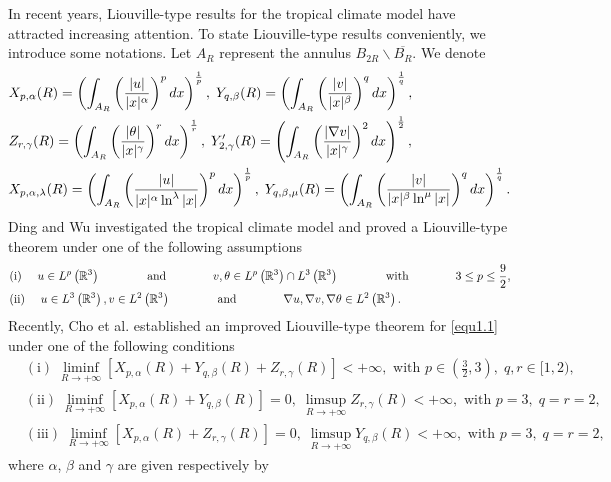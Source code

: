 \documentclass[11pt,reqno]{amsart}
\numberwithin{Thm}{section}
\begin{document}
In recent years, Liouville-type results for the tropical climate model have attracted increasing attention.
To state Liouville-type results conveniently, we introduce some notations.
Let $A_R$ represent the annulus $B_{2R}\backslash \overline{B_R}$. We denote
\begin{align}
&X_{p,\alpha}(R)=\left(\int_{A_R}\left(\frac{|u|}{|x|^\alpha}\right)^pdx\right)^\frac{1}{p},\;Y_{q,\beta}(R)=\left(\int_{A_R}\left(\frac{|v|}{|x|^\beta}\right)^qdx\right)^\frac{1}{q},\notag \\
&Z_{r,\gamma}(R)=\left(\int_{A_R}\left(\frac{|\theta|}{|x|^\gamma}\right)^rdx\right)^\frac{1}{r},\;Y'_{2,\gamma}(R)=\left(\int_{A_R}\left(\frac{|\nabla v|}{|x|^\gamma}\right)^2dx\right)^\frac{1}{2},\label{nota}\\
&X_{p,\alpha,\lambda}(R)=\left(\int_{A_R}\left(\frac{|u|}{|x|^\alpha\ln^\lambda |x|}\right)^pdx\right)^\frac{1}{p},\;Y_{q,\beta,\mu}(R)=\left(\int_{A_R}\left(\frac{|v|}{|x|^\beta\ln^\mu |x|}\right)^qdx\right)^\frac{1}{q}.\notag
\end{align}
Ding and Wu \cite{FW21} investigated the tropical climate model and proved a Liouville-type theorem under one of the following assumptions
$$
\aligned
&(\mathrm{i})~~~~u\in L^p\left(\mathbb{R}^{3}\right) ~~~~~~~~~~~~\text{and}~~~~~~~~~~~~v,\theta\in L^p\left(\mathbb{R}^{3}\right)\cap L^3\left(\mathbb{R}^{3}\right) ~~~~~~~~~~~~\text{with}~~~~~~~~~~~~ 3\leq p\leq \frac{9}{2},\\
&(\mathrm{ii})~~~~u\in L^{3}\left(\mathbb{R}^{3}\right), v \in L^{2}\left(\mathbb{R}^3\right)~~~~~~~~~~~~\text{and}~~~~~~~~~~~~\nabla u,\nabla v,\nabla\theta \in L^{2}\left(\mathbb{R}^3\right).
\endaligned
$$
Recently, Cho et al. \cite{CIY24} established an improved Liouville-type theorem for \eqref{equ1.1} under one of the following conditions
\begin{align*}
&(\mathrm{i})\;\liminf_{R\rightarrow+\infty}\left[X_{p,\alpha}(R)+Y_{q,\beta}(R)+Z_{r,\gamma}(R)\right]<+\infty, \text{ with }p\in\left(\frac{3}{2},3\right),\;q,r\in[1,2),\\
&(\mathrm{ii})\;\liminf_{R\rightarrow+\infty}\left[X_{p,\alpha}(R)+Y_{q,\beta}(R)\right]=0,\;\limsup_{R\rightarrow+\infty}Z_{r,\gamma}(R)<+\infty,\text{ with }p=3,\;q=r=2,\\
&(\mathrm{iii})\;\liminf_{R\rightarrow+\infty}\left[X_{p,\alpha}(R)+Z_{r,\gamma}(R)\right]=0,\;\limsup_{R\rightarrow+\infty}Y_{q,\beta}(R)<+\infty,\text{ with }p=3,\;q=r=2,
\end{align*}
where $\alpha$, $\beta$ and $\gamma$ are given respectively by
\end{document}
